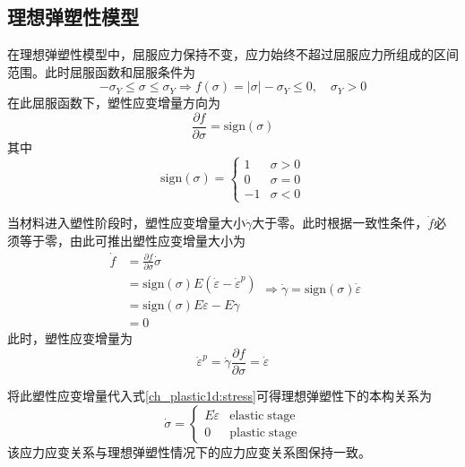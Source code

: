 \subsection{理想弹塑性模型}
在理想弹塑性模型中，屈服应力保持不变，应力始终不超过屈服应力所组成的区间范围。此时屈服函数和屈服条件为
\begin{equation}
-\sigma_Y \le \sigma \le \sigma_Y \Rightarrow f(\sigma) = \vert \sigma \vert - \sigma_Y \le 0, \quad \sigma_Y > 0
\end{equation}
在此屈服函数下，塑性应变增量方向为
\begin{equation}
    \frac{\partial f}{\partial \sigma} = \mathrm{sign}(\sigma)
\end{equation}
其中
\begin{equation}
    \mathrm{sign}(\sigma) =
    \begin{cases}
        1 & \sigma > 0 \\
        0 & \sigma = 0 \\
        -1 & \sigma < 0
    \end{cases}
\end{equation}\par
当材料进入塑性阶段时，塑性应变增量大小$\dot \gamma$大于零。此时根据一致性条件，$\dot f$必须等于零，由此可推出塑性应变增量大小为
\begin{equation}
    \begin{split}
        \dot f &= \frac{\partial f}{\partial \sigma} \dot \sigma \\
               &= \mathrm{sign}(\sigma) E (\dot \varepsilon - \dot \varepsilon^p) \\
               &= \mathrm{sign}(\sigma) E \dot \varepsilon - E \dot \gamma \\
               &= 0
    \end{split} \Rightarrow
    \dot \gamma = \mathrm{sign}(\sigma) \dot \varepsilon
\end{equation}
此时，塑性应变增量为
\begin{equation}
\dot \varepsilon^p = \dot \gamma \frac{\partial f}{\partial \sigma} = \dot \varepsilon
\end{equation}\par
将此塑性应变增量代入式\eqref{ch_plastic1d:stress}可得理想弹塑性下的本构关系为
\begin{equation}\label{ch_plastic1d:ideal}
\dot \sigma =
\begin{cases}
    E\dot \varepsilon & \mathrm{elastic \; stage} \\
    0 & \mathrm{plastic \; stage}
\end{cases}
\end{equation}
该应力应变关系与理想弹塑性情况下的应力应变关系图保持一致。

